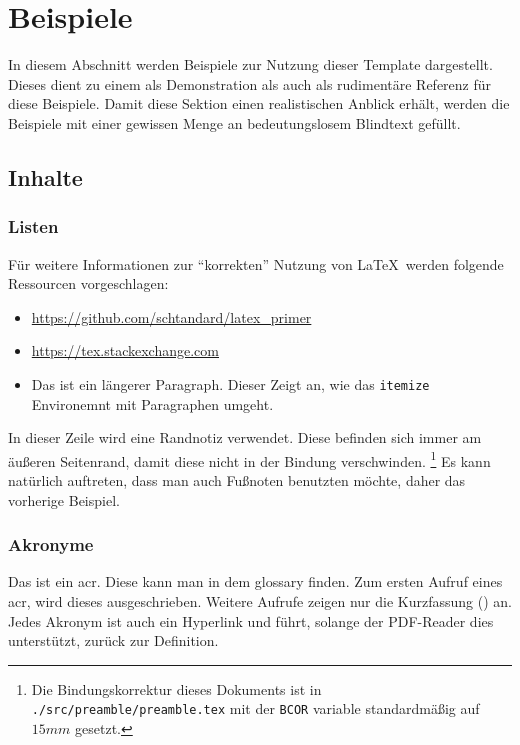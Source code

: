 \chapter{Beispiele}

In diesem Abschnitt werden Beispiele zur Nutzung dieser Template dargestellt.
Dieses dient zu einem als Demonstration als auch als rudimentäre Referenz für diese Beispiele.
Damit diese Sektion einen realistischen Anblick erhält, werden die Beispiele mit einer gewissen Menge an bedeutungslosem Blindtext gefüllt.

\section{Inhalte}

\subsection{Listen}

Für weitere Informationen zur \enquote{korrekten} Nutzung von \LaTeX\ werden folgende Ressourcen vorgeschlagen:

\begin{itemize}
    \item \url{https://github.com/schtandard/latex_primer}
    \item \url{https://tex.stackexchange.com}
    \item Das ist ein längerer Paragraph.
    Dieser Zeigt an, wie das \texttt{itemize} Environemnt mit Paragraphen umgeht.
\end{itemize}

In dieser Zeile wird eine Randnotiz verwendet.
Diese befinden sich immer am äußeren Seitenrand, damit diese nicht in der Bindung verschwinden.
\footnote{Die Bindungskorrektur dieses Dokuments ist in \texttt{./src/preamble/preamble.tex} mit der \texttt{BCOR} variable standardmäßig auf $15\si{mm}$ gesetzt.}
Es kann natürlich auftreten, dass man auch Fußnoten benutzten möchte, daher das vorherige Beispiel.

\subsection{Akronyme}

Das ist ein \gls{acr}.
Diese kann man in dem \gls{glossary} finden.
Zum ersten Aufruf eines \gls{acr}, wird dieses ausgeschrieben.
Weitere Aufrufe zeigen nur die Kurzfassung () an.
Jedes Akronym ist auch ein Hyperlink und führt, solange der PDF-Reader dies unterstützt, zurück zur Definition.

